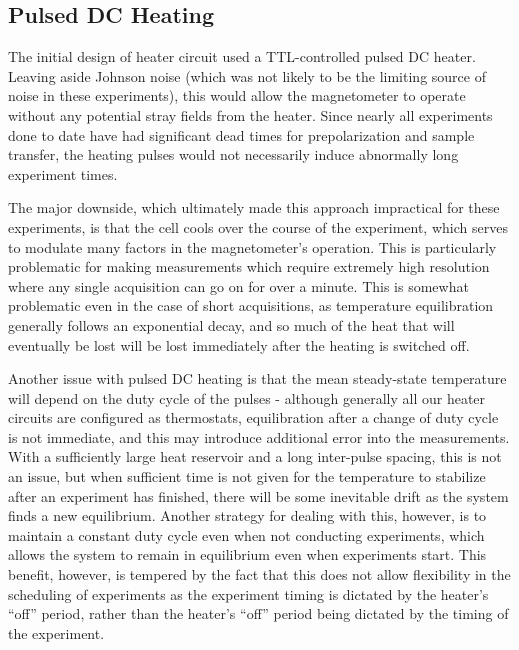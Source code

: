 \documentclass[PaulGanssle-Thesis.tex]{subfiles}
\begin{document}
\subsection{Pulsed DC Heating}
\label{mag.design.pulsed.DC}
The initial design of heater circuit used a TTL-controlled pulsed DC heater. Leaving aside Johnson noise (which was not likely to be the limiting source of noise in these experiments), this would allow the magnetometer to operate without any potential stray fields from the heater. Since nearly all experiments done to date have had significant dead times for prepolarization and sample transfer, the heating pulses would not necessarily induce abnormally long experiment times.

The major downside, which ultimately made this approach impractical for these experiments, is that the cell cools over the course of the experiment, which serves to modulate many factors in the magnetometer's operation. This is particularly problematic for making measurements which require extremely high resolution where any single acquisition can go on for over a minute. This is somewhat problematic even in the case of short acquisitions, as temperature equilibration generally follows an exponential decay, and so much of the heat that will eventually be lost will be lost immediately after the heating is switched off.

Another issue with pulsed DC heating is that the mean steady-state temperature will depend on the duty cycle of the pulses - although generally all our heater circuits are configured as thermostats, equilibration after a change of duty cycle is not immediate, and this may introduce additional error into the measurements. With a sufficiently large heat reservoir and a long inter-pulse spacing, this is not an issue, but when sufficient time is not given for the temperature to stabilize after an experiment has finished, there will be some inevitable drift as the system finds a new equilibrium. Another strategy for dealing with this, however, is to maintain a constant duty cycle even when not conducting experiments, which allows the system to remain in equilibrium even when experiments start. This benefit, however, is tempered by the fact that this does not allow flexibility in the scheduling of experiments as the experiment timing is dictated by the heater's ``off'' period, rather than the heater's ``off'' period being dictated by the timing of the experiment.
\end{document}
